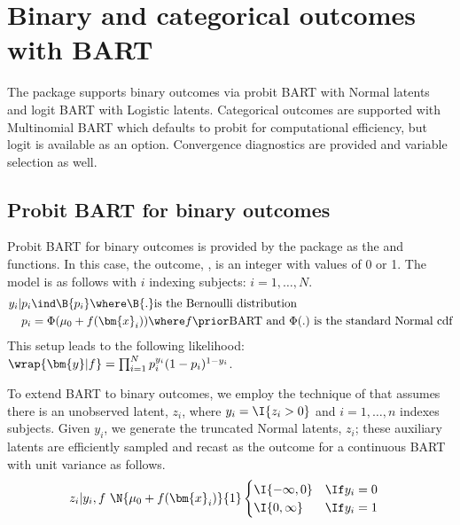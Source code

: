 \documentclass[article]{jss}
\begin{document}
\section{Binary and categorical outcomes with BART}\label{bincat}

The  package supports binary outcomes via probit BART with
Normal latents and logit BART with Logistic latents.  Categorical
outcomes are supported with Multinomial BART which defaults to probit
for computational efficiency, but logit is available as an option.
Convergence diagnostics are provided and variable selection as well.

\subsection{Probit BART for binary outcomes}

Probit BART for binary outcomes is provided by the  package
as the  and  functions.  In this case, the
outcome, , is an integer with values of 0 or 1.  The
model is as follows with $i$ indexing subjects: $i=1, \dots, N$.
\begin{align*}
y_{i}|p_{i} & \ind \B{p_{i}} 
\where \B{.} \mbox{is the Bernoulli distribution} \\
p_{i} & =  \Phi({\mu}_0+f(\bm{x}_i)) \where f \prior \mathrm{BART} 
\mbox{\ and\ } \Phi(.) \mbox{\ is the standard Normal cdf}
\end{align*}
This setup leads to the following likelihood:
$\wrap{\bm{y}|f} = \prod_{i=1}^N p_{i}^{y_i}(1-p_{i})^{1-y_i}$. 


To extend BART to binary outcomes, we employ the technique of
\cite{AlbeChib93} that assumes there is an unobserved latent, $z_i$,
where $y_i=\I{z_i>0}$ and $i=1, \dots, n$ indexes subjects. Given
$y_i$, we generate the truncated Normal latents, $z_i$; these
auxiliary latents are efficiently sampled \citep{Robe95} and recast as
the outcome for a continuous BART with unit variance as follows.
\begin{align*}
z_{i}|y_{i},f & ~ \N{{\mu}_0+ f(\bm{x}_i)}{1} \begin{cases}
\I{-\infty, 0} & \If y_{i}=0 \\
\I{0, \infty} & \If y_{i}=1 \\
\end{cases}  
\end{align*}
\end{document}
